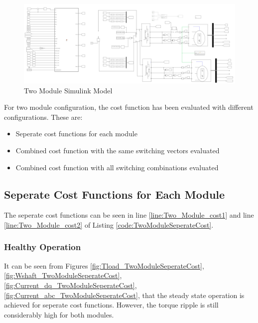 \documentclass{article}
\begin{document}
\begin{figure}[H]
\centering
\includegraphics[scale=0.4]{Figures/TwoModuleSimulinkModel.PNG}
\caption{Two Module Simulink Model}
\label{fig:TwoModuleSimulinkModel}
\end{figure}

For two module configuration, the cost function has been evaluated with different configurations. These are:
\begin{itemize}
    \item Seperate cost functions for each module
    \item Combined cost function with the same switching vectors evaluated
    \item Combined cost function with all switching combinations evaluated
\end{itemize}

\subsection{Seperate Cost Functions for Each Module}
The seperate cost functions can be seen in line \ref{line:Two_Module_cost1} and line \ref{line:Two_Module_cost2} of Listing \ref{code:TwoModuleSeperateCost}. 


\subsubsection{Healthy Operation}


It can be seen from Figures \ref{fig:Tload_TwoModuleSeperateCost}, \ref{fig:Wshaft_TwoModuleSeperateCost}, \ref{fig:Current_dq_TwoModuleSeperateCost}, \ref{fig:Current_abc_TwoModuleSeperateCost}, that the steady state operation is achieved for seperate cost functions. However, the torque ripple is still considerably high for both modules.
\end{document}
